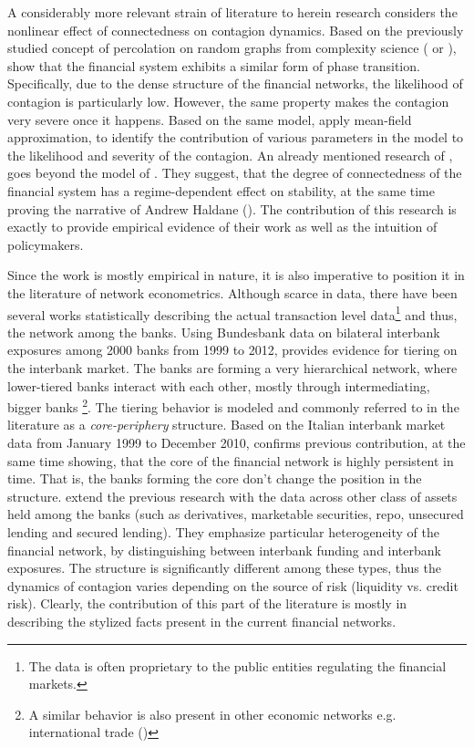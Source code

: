 \documentclass[12pt]{article}
\begin{document}
A considerably more relevant strain of literature to herein research considers the nonlinear effect of connectedness on contagion dynamics. Based on the previously studied concept of percolation on random graphs from complexity science (\cite{callaway00} or \cite{newman001}), \cite{gai10} show that the financial system exhibits a similar form of phase transition. Specifically, due to the dense structure of the financial networks, the likelihood of contagion is particularly low. However, the same property makes the contagion very severe once it happens. Based on the same model, \cite{may10} apply mean-field approximation, to identify the contribution of various parameters in the model to the likelihood and severity of the contagion. An already mentioned research of \cite{acemoglu13}, goes beyond the model of \cite{gai10}. They suggest, that the degree of connectedness of the financial system has a regime-dependent effect on stability, at the same time proving the narrative of Andrew Haldane (\cite{haldane13}). The contribution of this research is exactly to provide empirical evidence of their work as well as the intuition of policymakers.  

Since the work is mostly empirical in nature, it is also imperative to position it in the literature of network econometrics. Although scarce in data, there have been several works statistically describing the actual transaction level data\footnote{The data is often proprietary to the public entities regulating the financial markets.} and thus, the network among the banks.  Using Bundesbank data on bilateral interbank exposures among 2000 banks from 1999 to 2012, \cite{craig14} provides evidence for tiering on the interbank market. The banks are forming a very hierarchical network, where lower-tiered banks interact with each other, mostly through intermediating, bigger banks \footnote{A similar behavior is also present in other economic networks e.g. international trade (\cite{antras11})}. The tiering behavior is modeled and commonly referred to in the literature as a \textit{core-periphery} structure. Based on the Italian interbank market data from January 1999 to December 2010, \cite{fricke2015} confirms previous contribution, at the same time showing, that the core of the financial network is highly persistent in time. That is, the banks forming the core don't change the position in the structure. \cite{langfield14} extend the previous research with the data across other class of assets held among the banks (such as derivatives, marketable securities, repo, unsecured lending and secured lending). They emphasize particular heterogeneity of the financial network, by distinguishing between interbank funding and interbank exposures. The structure is significantly different among these types, thus the dynamics of contagion varies depending on the source of risk (liquidity vs. credit risk). Clearly, the contribution of this part of the literature is mostly in describing the stylized facts present in the current financial networks.
\end{document}
